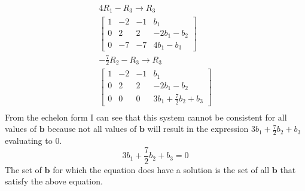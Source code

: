 \documentclass[12pt letter]{report}
\begin{document}
{\begin{align*}
    4R_1 - R_3 \to R_3                        \\
    \begin{bmatrix}
      1 & -2 & -1 & b_1         \\
      0 & 2  & 2  & -2b_1 - b_2 \\
      0 & -7 & -7 & 4b_1 - b_3
    \end{bmatrix}                 \\
    -\frac{7}{2}R_2 - R_3 \to R_3             \\
    \begin{bmatrix}
      1 & -2 & -1 & b_1                         \\
      0 & 2  & 2  & -2b_1 - b_2                 \\
      0 & 0  & 0  & 3b_1 + \frac{7}{2}b_2 + b_3
    \end{bmatrix} \\
  \end{align*}
  From the echelon form I can see that this system cannot be consistent for all values of $\mathbf{b}$ because not all
  values of $\mathbf{b}$ will result in the expression $3b_1 + \frac{7}{2}b_2 + b_3$ evaluating to 0.
  \[
    3b_1 + \frac{7}{2}b_2 + b_3 = 0
  \]
  The set of $\mathbf{b}$ for which the equation does have a solution is the set of all $\mathbf{b}$ that satisfy the
  above equation.
}
\end{document}
